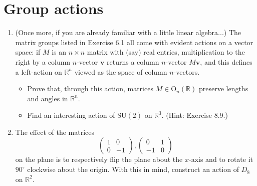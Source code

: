 \section{Group actions}
\begin{enumerate}
      \item (Once more, if you are already familiar with a little linear algebra...) The matrix groups listed in Exercise 6.1 all come with evident actions on a vector space: if $M$ is an $n \times n$ matrix with (say) real entries, multiplication to the right by a column $n$-vector $\mathbf{v}$ returns a column $n$-vector $M\mathbf{v}$, and this defines a left-action on $\mathbb{R}^n$ viewed as the space of column $n$-vectors.
            \begin{itemize}
                  \item Prove that, through this action, matrices $M \in \text{O}_n(\mathbb{R})$ preserve lengths and angles in $\mathbb{R}^n$.
                  \item Find an interesting action of $\text{SU}(2)$ on $\mathbb{R}^3$. (Hint: Exercise 8.9.)
            \end{itemize}

      \item The effect of the matrices
            \[ \begin{pmatrix} 1 & 0 \\ 0 & -1 \end{pmatrix}, \begin{pmatrix} 0 & 1 \\ -1 & 0 \end{pmatrix} \]
            on the plane is to respectively flip the plane about the $x$-axis and to rotate it $90^\circ$ clockwise about the origin. With this in mind, construct an action of $D_8$ on $\mathbb{R}^2$.


\end{enumerate}
